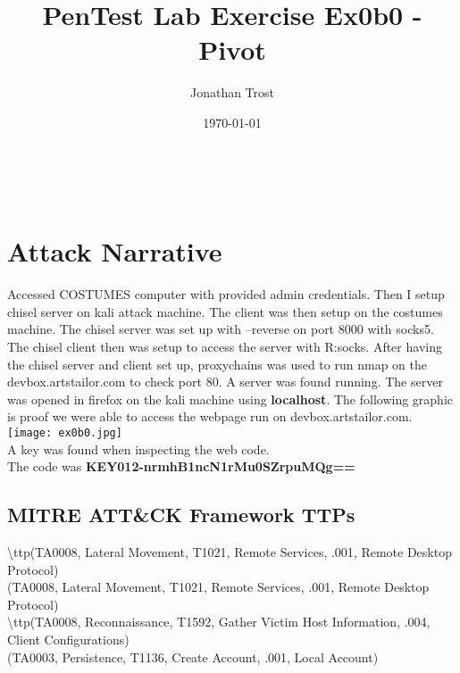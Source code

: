 \documentclass[notitlepage]{article}
\begin{document}
	
	
	\title{PenTest Lab Exercise Ex0b0 - Pivot}
	\author{Jonathan Trost}
	\date{\isodate\today}
	
	\maketitle
	
	\tableofcontents
	
	\newpage \\
	
	\section{Attack Narrative}
	\indent Accessed COSTUMES computer with provided admin credentials. Then I setup chisel server on kali attack machine. The client was then setup on the costumes machine. The chisel server was set up with --reverse on port 8000 with socks5.  The chisel client then was setup to access the server with R:socks. After having the chisel server and client set up, proxychains was used to run nmap on the devbox.artstailor.com to check port 80. A server was found running. The server was opened in firefox on the kali machine using \textbf{localhost}. The following graphic is proof we were able to access the webpage run on devbox.artstailor.com. \\
	\texttt{[image: ex0b0.jpg]} \\
	
	 A key was found when inspecting the web code. \\
	
	\indent The code was \textbf{KEY012-nrmhB1ncN1rMu0SZrpuMQg==} \\
	
	\subsection{MITRE ATT{\&}CK Framework TTPs}
	
	\indent\textbackslash ttp(TA0008, Lateral Movement, T1021, Remote Services, .001, Remote Desktop Protocol) \\
	\ttp(TA0008, Lateral Movement, T1021, Remote Services, .001, Remote Desktop Protocol) \\
	
	\indent\textbackslash ttp(TA0008, Reconnaissance, T1592, Gather Victim Host Information, .004, Client Configurations) \\
	\ttp(TA0003, Persistence, T1136, Create Account, .001, Local Account) \\
\end{document}
